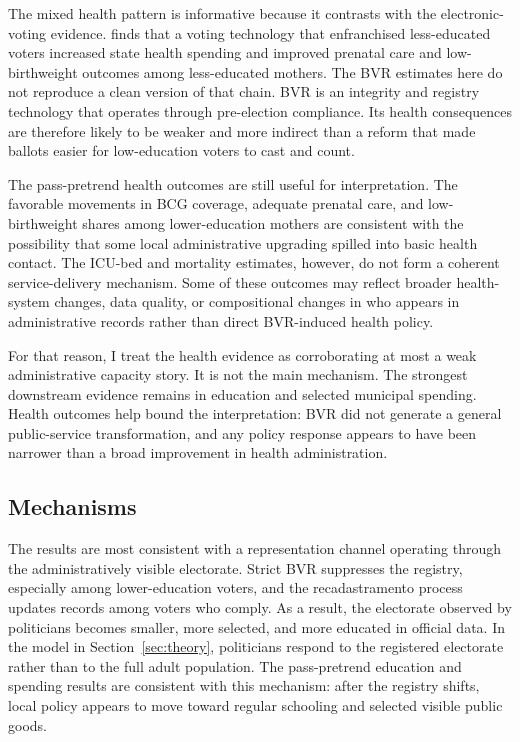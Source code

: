 The mixed health pattern is informative because it contrasts with the electronic-voting evidence. \citet{Fujiwara2015VotingTechnoloPolitica} finds that a voting technology that enfranchised less-educated voters increased state health spending and improved prenatal care and low-birthweight outcomes among less-educated mothers. The BVR estimates here do not reproduce a clean version of that chain. BVR is an integrity and registry technology that operates through pre-election compliance. Its health consequences are therefore likely to be weaker and more indirect than a reform that made ballots easier for low-education voters to cast and count.

The pass-pretrend health outcomes are still useful for interpretation. The favorable movements in BCG coverage, adequate prenatal care, and low-birthweight shares among lower-education mothers are consistent with the possibility that some local administrative upgrading spilled into basic health contact. The ICU-bed and mortality estimates, however, do not form a coherent service-delivery mechanism. Some of these outcomes may reflect broader health-system changes, data quality, or compositional changes in who appears in administrative records rather than direct BVR-induced health policy.

For that reason, I treat the health evidence as corroborating at most a weak administrative capacity story. It is not the main mechanism. The strongest downstream evidence remains in education and selected municipal spending. Health outcomes help bound the interpretation: BVR did not generate a general public-service transformation, and any policy response appears to have been narrower than a broad improvement in health administration.

\subsection{Mechanisms}
\label{ssec:policy-mechanisms}

The results are most consistent with a representation channel operating through the administratively visible electorate. Strict BVR suppresses the registry, especially among lower-education voters, and the recadastramento process updates records among voters who comply. As a result, the electorate observed by politicians becomes smaller, more selected, and more educated in official data. In the model in Section~\ref{sec:theory}, politicians respond to the registered electorate rather than to the full adult population. The pass-pretrend education and spending results are consistent with this mechanism: after the registry shifts, local policy appears to move toward regular schooling and selected visible public goods.


